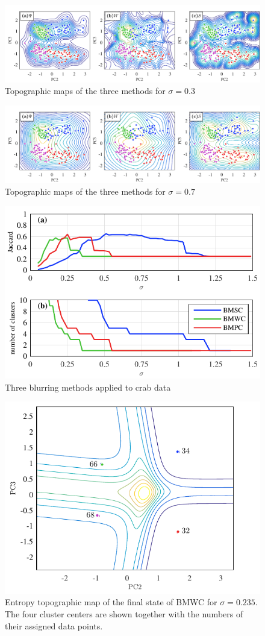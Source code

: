 \documentclass[preprint,12pt]{elsarticle}
\begin{document}
\begin{figure}[h]
\centering
\includegraphics[width=1\linewidth]{fig9.pdf}
\caption{Topographic maps of the three methods for $\sigma= 0.3$}
\label{crabs_0.3}
\end{figure}

\begin{figure}[h]
\centering
\includegraphics[width=1\linewidth]{fig10.pdf}
\caption{Topographic maps of the three methods for $\sigma= 0.7$}
\label{crabs_0.7}
\end{figure}

\begin{figure}[t]
\centering
\includegraphics[width=0.6\linewidth]{fig11.pdf}
\caption{Three blurring methods applied to crab data}
\label{crabs_jaccard_blurring}
\end{figure}

\begin{figure}[t]
\centering
\includegraphics[width=0.6\linewidth]{fig12.pdf}
\caption{Entropy topographic map of the final state of BMWC for $\sigma = 0.235$. The four cluster centers are shown together with the numbers of their assigned data points.}
\label{crabs_W_final}
\end{figure}
\end{document}
